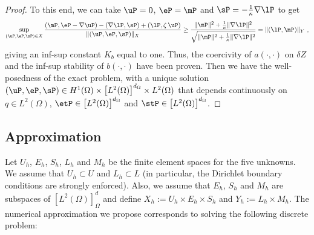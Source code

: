 \begin{theorem}[Uniqueness]
\begin{proof}
		To this end, we can take $\uP=0$, $\eP=\mP$ and $\sP=-\frac{1}{\kappa}\nabla \lP$ to get
		\begin{equation*}
			\sup_{(\uP,\eP,\sP)\in X} \frac{\left (\mP,\eP-\nabla \uP \right ) - \left (\nabla \lP, \sP \right ) + \left ( \lP, \zeta\,\uP \right )}{\|(\uP,\eP,\sP)\|_X} 
			\geq \frac{\|\mP\|^2 + \frac{1}{\kappa}\|\nabla \lP\|^2}{\sqrt{\|\mP\|^2 + \frac{1}{\kappa}\|\nabla \lP \|^2}} = \|(\lP,\mP)\|_Y~,
		\end{equation*}
		giving an inf-sup constant $K_b$ equal to one. Thus, the coercivity of $a(\cdot,\cdot)$ on $\delta Z$ and the inf-sup stability of $b(\cdot,\cdot)$ have been proven. Then we have the well-posedness of the exact problem, with a unique solution $(\uP,\eP,\sP)\in H^1(\Omega) \times \left[L^2(\Omega)\right]^{d_{\Omega}} \times L^2(\Omega)$ that depends continuously on $q\in L^2(\Omega)$, $\etP \in \left[L^2(\Omega)\right]^{d_{\Omega}}$ and $\stP \in \left[L^2(\Omega)\right]^{d_{\Omega}}$.
	\end{proof}
\end{theorem}


\subsection{Approximation}

Let $U_h$, $E_h$, $S_h$, $L_h$ and $M_h$ be the finite element spaces for the five unknowns. We assume that $U_h\subset U$ and $L_h\subset L$ (in particular, the Dirichlet boundary conditions are strongly enforced). 
Also, we assume that $E_h$, $S_h$ and $M_h$ are subspaces of $[L^2(\Omega)]^d_{\Omega}$ and define $X_h:=U_h\times E_h \times S_h$ and $Y_h:=L_h\times M_h$. The numerical approximation we propose corresponds to solving the following discrete problem:

